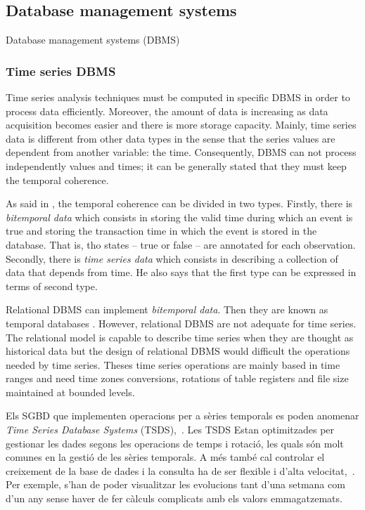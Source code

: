 \subsection{Database management systems}

Database management systems (DBMS)


\subsubsection{Time series DBMS}

Time series analysis techniques must be computed in specific DBMS in order to process data efficiently. Moreover, the amount of data is increasing as data acquisition becomes easier and there is more storage capacity. 
Mainly, time series data is different from other data types in the sense that the series values are dependent from another variable: the time. Consequently, DBMS can not process independently values and times; it can be generally stated that they must keep the temporal coherence. 


As said in \textcite{assfalg08:thesis}, the temporal coherence can be divided in two types. Firstly, there is  \emph{bitemporal data} which consists in storing the valid time during which an event is true and storing the transaction time in which the event is stored in the database. That is, tho states -- true or false -- are annotated for each observation.  Secondly, there is \emph{time series data} which consists in describing a collection of data that depends from time. He also says that the first type can be expressed in terms of second type.

Relational DBMS can implement \emph{bitemporal data}. Then they are known as temporal databases \parencite[ch.\ 22]{date}. However, relational DBMS are not adequate for time series. The relational model is capable to describe time series when they are thought as historical data but the design of relational DBMS would difficult the operations  needed by time series. Theses time series operations are mainly based in time ranges and need time zones conversions, rotations of table registers and file size maintained at bounded levels.



Els SGBD que implementen operacions per a sèries temporals es poden anomenar \emph{Time Series Database Systems} (TSDS),~\cite{tsds}. Les TSDS Estan optimitzades per gestionar les dades segons les operacions de temps i rotació, les quals són molt comunes en la gestió de les sèries temporals.  A més també cal controlar el creixement de la base de dades i la consulta ha de ser flexible i d'alta velocitat,~\cite{keogh10:isax}. Per exemple, s'han de poder visualitzar les evolucions tant d'una setmana com d'un any sense haver de fer càlculs complicats amb els valors emmagatzemats. 


